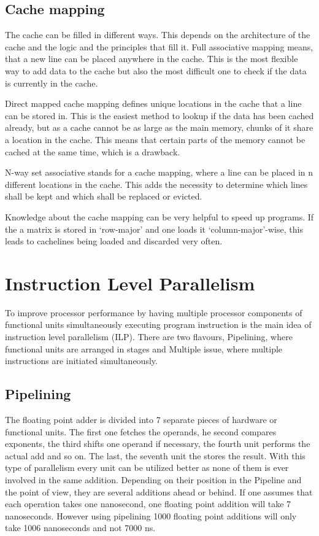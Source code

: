 \documentclass{article}
\begin{document}
\subsection{Cache mapping} %
\label{sub:cache_mapping}
	The cache can be filled in different ways.
	This depends on the architecture of the cache
	and the logic and the principles that fill it.
	Full associative mapping means,
	that a new line can be placed anywhere in the cache.
	This is the most flexible way to add data to the cache
	but also the most difficult one to check if the data is currently in the cache.

	Direct mapped cache mapping defines unique locations in the cache that a line can be stored in. This is the easiest method to lookup if the data has been cached already,
	but as a cache cannot be as large as the main memory,
	chunks of it share a location in the cache.
	This means that certain parts of the memory cannot be cached at the same time,
	which is a drawback.

	N-way set associative stands for a cache mapping,
	where a line can be placed in n different locations in the cache.
	This adds the necessity to determine which lines shall be kept
	and which shall be replaced or evicted.

	Knowledge about the cache mapping can be very helpful to speed up programs.
	If the a matrix is stored in ‘row-major’
	and one loads it ‘column-major’-wise,
	this leads to cachelines being loaded and discarded very often.

\section{Instruction Level Parallelism} %
\label{sec:instruction_level_parallelism}
To improve processor performance by having multiple processor components of functional units simultaneously executing program instruction is the main idea of instruction level parallelism (ILP). There are two flavours, Pipelining, where functional units are arranged in stages and Multiple issue, where multiple instructions are initiated simultaneously.

\subsection{Pipelining} %
\label{sub:pipelining}
	The floating point adder is divided into 7 separate pieces of hardware or functional units.
	The first one fetches the operands, 
	he second compares exponents,
	the third shifts one operand if necessary,
	the fourth unit performs the actual add and so on.
	The last, the seventh unit the stores the result.
	With this type of parallelism every unit can be utilized better
	as none of them is ever involved in the same addition.
	Depending on their position in the Pipeline and the point of view,
	they are several additions ahead or behind.
	If one assumes that each operation takes one nanosecond,
	one floating point addition will take 7 nanoseconds.
	However using pipelining 1000 floating point additions will only take 1006 nanoseconds
	and not 7000 ns.
\end{document}
